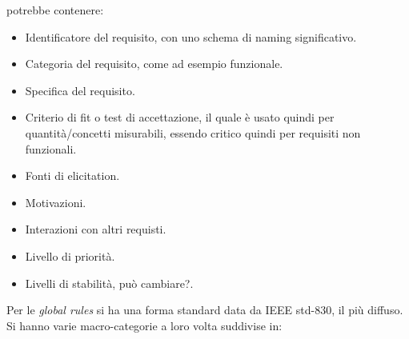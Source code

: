 potrebbe contenere:
\begin{itemize}
      \item Identificatore del requisito, con uno schema di naming significativo.
      \item Categoria del requisito, come ad esempio funzionale.
      \item Specifica del requisito.
      \item Criterio di fit o test di accettazione, il quale è usato quindi per
            quantità/concetti misurabili, essendo critico quindi per requisiti
            non funzionali.
      \item Fonti di elicitation.
      \item Motivazioni.
      \item Interazioni con altri requisti.
      \item Livello di priorità.
      \item Livelli di stabilità, può cambiare?.
\end{itemize}
Per le \textit{global rules} si ha una forma standard data da IEEE std-830, il
più diffuso. Si hanno varie macro-categorie a loro volta suddivise in:
